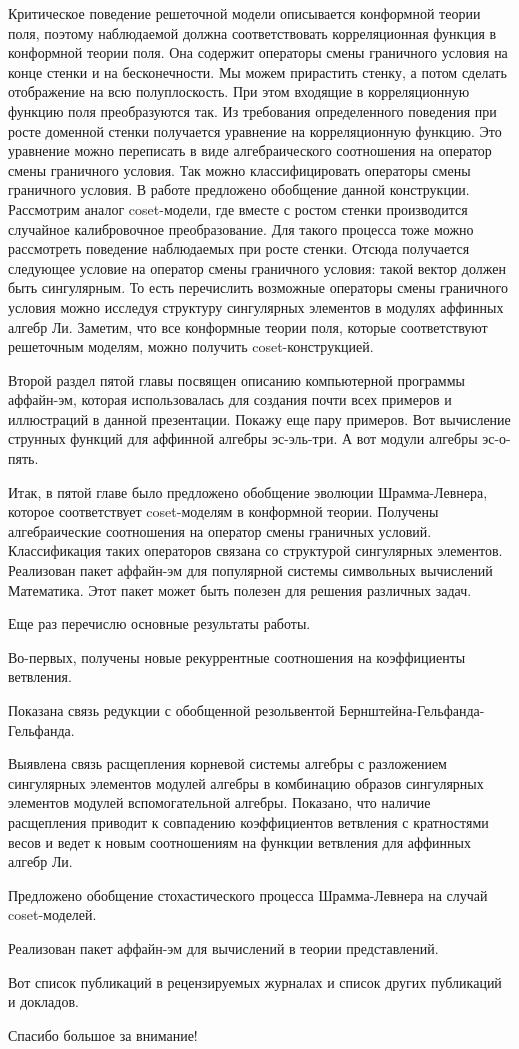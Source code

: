 \documentclass{article}
\theoremstyle{definition} \newtheorem{Def}{Определение}
\begin{document}
Критическое поведение решеточной модели описывается конформной теории поля, поэтому наблюдаемой должна соответствовать корреляционная функция в конформной теории поля. Она содержит операторы смены граничного условия на конце стенки и на бесконечности. Мы можем прирастить стенку, а потом сделать отображение на всю полуплоскость. При этом входящие в корреляционную функцию поля преобразуются так. Из требования определенного поведения при росте доменной стенки получается уравнение на корреляционную функцию. Это уравнение можно переписать в виде алгебраического соотношения на оператор смены граничного условия. Так можно классифицировать операторы смены граничного условия. 
В работе предложено обобщение данной конструкции. Рассмотрим аналог coset-модели, где вместе с ростом стенки производится случайное калибровочное преобразование. 
Для такого процесса тоже можно рассмотреть поведение наблюдаемых при росте стенки. Отсюда получается следующее условие на оператор смены граничного условия: такой вектор должен быть сингулярным. То есть перечислить возможные операторы смены граничного условия можно исследуя структуру сингулярных элементов в модулях аффинных алгебр Ли. Заметим, что все конформные теории поля, которые соответствуют решеточным моделям, можно получить coset-конструкцией. 

Второй раздел пятой главы посвящен описанию компьютерной программы аффайн-эм, которая использовалась для создания почти всех примеров и иллюстраций в данной презентации. Покажу еще пару примеров. Вот вычисление струнных функций для аффинной алгебры эс-эль-три. А вот модули алгебры эс-о-пять. 

Итак, в пятой главе было предложено обобщение эволюции Шрамма-Левнера, которое соответствует coset-моделям в конформной теории. Получены алгебраические соотношения на оператор смены граничных условий. Классификация таких операторов связана со структурой сингулярных элементов. Реализован пакет аффайн-эм для популярной системы символьных вычислений Математика. Этот пакет может быть полезен для решения различных задач. 

Еще раз перечислю основные результаты работы. 

Во-первых, получены новые рекуррентные соотношения на коэффициенты ветвления. 

Показана связь редукции с обобщенной резольвентой Бернштейна-Гельфанда-Гельфанда. 

Выявлена связь расщепления корневой системы алгебры с разложением сингулярных элементов модулей алгебры в комбинацию образов сингулярных элементов модулей вспомогательной алгебры. Показано, что наличие расщепления приводит к совпадению коэффициентов ветвления с кратностями весов и ведет к новым соотношениям на функции ветвления для аффинных алгебр Ли. 

Предложено обобщение стохастического процесса Шрамма-Левнера на случай coset-моделей. 

Реализован пакет аффайн-эм для вычислений в теории представлений.

Вот список публикаций в рецензируемых журналах и список других публикаций и докладов. 

Спасибо большое за внимание!
\end{document}
